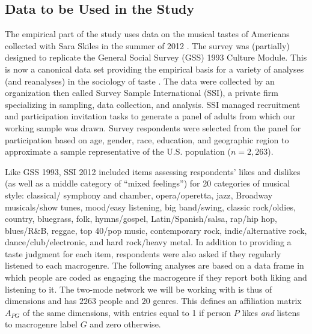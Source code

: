 \documentclass[a4paper,12pt]{extarticle}
\begin{document}
\subsection{Data to be Used in the Study}
The empirical part of the study uses data on the musical tastes of Americans collected with Sara Skiles in the summer of 2012 \citep{lizardo_skiles15, lizardo_skiles16}. The survey was (partially) designed to replicate the General Social Survey (GSS) 1993 Culture Module. This is now a canonical data set providing the empirical basis for a variety of analyses (and reanalyses) in the sociology of taste \citep[e.g.,][]{bryson96, goldberg2011mapping, schultz2010strength, han2003unraveling, tampubolon2008revisiting, okada2017structure}.  The data were collected by an organization then called Survey Sample International (SSI), a private firm specializing in sampling, data collection, and analysis. SSI managed recruitment and participation invitation tasks to generate a panel of adults from which our working sample was drawn. Survey respondents were selected from the panel for participation based on age, gender, race, education, and geographic region to approximate a sample representative of the U.S. population ($n = 2,263$). 

Like GSS 1993, SSI 2012 included items assessing respondents’ likes and dislikes (as well as a middle category of ``mixed feelings'') for 20 categories of musical style: classical/ symphony and chamber, opera/operetta, jazz, Broadway musicals/show tunes, mood/easy listening, big band/swing, classic rock/oldies, country, bluegrass, folk, hymns/gospel, Latin/Spanish/salsa, rap/hip hop, blues/R\&B, reggae, top 40/pop music, contemporary rock, indie/alternative rock, dance/club/electronic, and hard rock/heavy metal. In addition to providing a taste judgment for each item, respondents were also asked if they regularly listened to each macrogenre. The following analyses are based on a data frame in which people are coded as engaging the macrogenre if they report both liking and listening to it. The two-mode network we will be working with is thus of dimensions and has $2263$ people and $20$ genres. This defines an affiliation matrix $A_{PG}$ of the same dimensions, with entries equal to 1 if person $P$ likes \textit{and} listens to macrogenre label $G$ and zero otherwise. 
\end{document}
